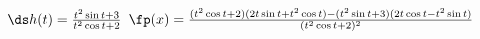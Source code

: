 {$\ds h(t) = \frac{t^2\sin t+3}{t^2\cos t+2}$
}
{$\fp(x) = \frac{(t^2\cos t+2)(2t\sin t+t^2\cos t)-(t^2\sin t+3)(2t\cos t-t^2\sin t)}{(t^2\cos t+2)^2}$
}
